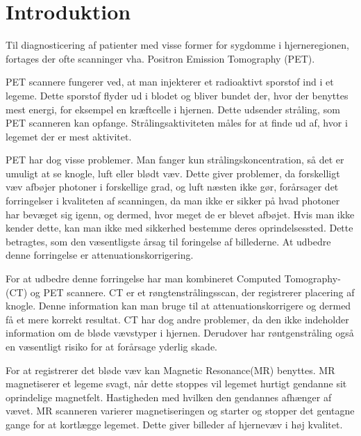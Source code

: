 \section{Introduktion}


Til diagnosticering af patienter med visse former for sygdomme i hjerneregionen, fortages der ofte scanninger vha. Positron Emission Tomography (PET). 

PET scannere fungerer ved, at man injekterer et radioaktivt sporstof
ind i et legeme. Dette sporstof flyder ud i blodet og bliver bundet
der, hvor der benyttes mest energi, for eksempel en kræftcelle i
hjernen. Dette udsender stråling, som PET scanneren kan opfange.
Strålingsaktiviteten måles for at finde ud af, hvor i legemet der er
mest aktivitet.\\


PET har dog visse problemer. Man fanger kun strålingskoncentration,
så det er umuligt at se knogle, luft eller blødt væv. Dette giver
problemer, da forskelligt væv afbøjer photoner i forskellige grad,
og luft næsten ikke gør, forårsager det forringelser i kvaliteten
af scanningen, da man ikke er sikker på hvad photoner har bevæget
sig igenn, og dermed, hvor meget de er blevet afbøjet. Hvis man ikke
kender dette, kan man ikke med sikkerhed bestemme deres oprindelsessted.
Dette betragtes, som den væsentligste årsag til foringelse af
billederne.\cite{vigtighedAfAttenuation} At udbedre denne forringelse er
attenuationskorrigering.

For at udbedre denne forringelse har man kombineret Computed
Tomography- (CT) og PET scannere. CT er et røngtenstrålingsscan,
der registrerer placering af knogle. Denne information kan man bruge
til at attenuationskorrigere og dermed få et mere korrekt resultat.
CT har dog andre problemer, da den ikke indeholder information om de
bløde vævstyper i hjernen. Derudover har røntgenstråling også
en væsentligt risiko for at forårsage yderlig skade. \cite{skadeligCT}

For at registrerer det bløde væv kan Magnetic Resonance(MR) benyttes.
MR magnetiserer et legeme svagt, når dette stoppes vil legemet hurtigt
gendanne sit oprindelige magnetfelt. Hastigheden med hvilken den gendannes
afhænger af vævet. MR scanneren varierer magnetiseringen og starter og
stopper det gentagne gange for at kortlægge legemet. Dette giver billeder
af hjernevæv i høj kvalitet.

